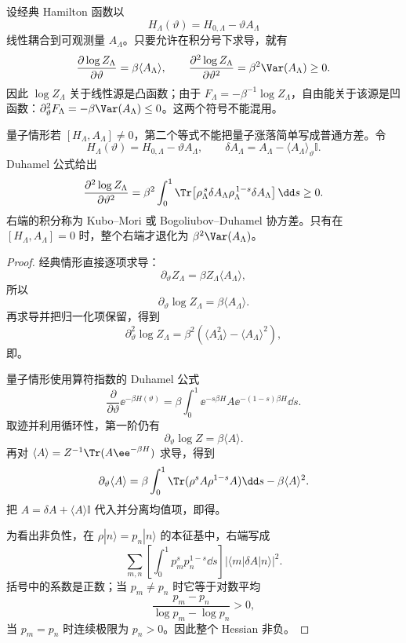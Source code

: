 \begin{proposition}[线性源的响应与凸性]
设经典 Hamilton 函数以
\[
 H_\Lambda(\vartheta)=H_{0,\Lambda}-\vartheta A_\Lambda
\]
线性耦合到可观测量 \(A_\Lambda\)。只要允许在积分号下求导，就有
\begin{equation}
 \frac{\partial\log Z_\Lambda}{\partial\vartheta}
 =\beta\langle A_\Lambda\rangle,
 \qquad
 \frac{\partial^2\log Z_\Lambda}{\partial\vartheta^2}
 =\beta^2\Var(A_\Lambda)\ge0.
 \label{eq:phys-sm-finite-response}
\end{equation}
因此 \(\log Z_\Lambda\) 关于线性源是凸函数；由于 \(F_\Lambda=-\beta^{-1}\log Z_\Lambda\)，自由能关于该源是凹函数：\(\partial_\vartheta^2F_\Lambda=-\beta\Var(A_\Lambda)\le0\)。这两个符号不能混用。

量子情形若 \([H_\Lambda,A_\Lambda]\neq0\)，第二个等式不能把量子涨落简单写成普通方差。令
\[
 H_\Lambda(\vartheta)=H_{0,\Lambda}-\vartheta A_\Lambda,
 \qquad
 \delta A_\Lambda=A_\Lambda-\langle A_\Lambda\rangle_\vartheta\mathbb I.
\]
Duhamel 公式给出
\begin{equation}
 \frac{\partial^2\log Z_\Lambda}{\partial\vartheta^2}
 =\beta^2
 \int_0^1
 \Tr\!\left[
 \rho_\Lambda^{\,s}\delta A_\Lambda
 \rho_\Lambda^{\,1-s}\delta A_\Lambda
 \right]\dd s
 \ge0.
 \label{eq:phys-sm-kubo-mori-response}
\end{equation}
右端的积分称为 Kubo--Mori 或 Bogoliubov--Duhamel 协方差。只有在 \([H_\Lambda,A_\Lambda]=0\) 时，整个右端才退化为 \(\beta^2\Var(A_\Lambda)\)。
\end{proposition}

\begin{proof}
经典情形直接逐项求导：
\[
 \partial_\vartheta Z_\Lambda
 =\beta Z_\Lambda\langle A_\Lambda\rangle,
\]
所以
\[
 \partial_\vartheta\log Z_\Lambda
 =\beta\langle A_\Lambda\rangle.
\]
再求导并把归一化项保留，得到
\[
 \partial_\vartheta^2\log Z_\Lambda
 =\beta^2
 \left(\langle A_\Lambda^2\rangle
 -\langle A_\Lambda\rangle^2\right),
\]
即。

量子情形使用算符指数的 Duhamel 公式
\[
 \frac{\partial}{\partial\vartheta}
 \ee^{-\beta H(\vartheta)}
 =\beta\int_0^1
 \ee^{-s\beta H}A
 \ee^{-(1-s)\beta H}\dd s.
\]
取迹并利用循环性，第一阶仍有
\[
 \partial_\vartheta\log Z=\beta\langle A\rangle.
\]
再对 \(\langle A\rangle=Z^{-1}\Tr(A\ee^{-\beta H})\) 求导，得到
\[
 \partial_\vartheta\langle A\rangle
 =\beta\int_0^1
 \Tr(\rho^sA\rho^{1-s}A)\dd s
 -\beta\langle A\rangle^2.
\]
把 \(A=\delta A+\langle A\rangle\mathbb I\) 代入并分离均值项，即得。

为看出非负性，在 \(\rho|n\rangle=p_n|n\rangle\) 的本征基中，右端写成
\[
 \sum_{m,n}
 \left[\int_0^1p_m^sp_n^{1-s}\dd s\right]
 |\langle m|\delta A|n\rangle|^2.
\]
括号中的系数是正数；当 \(p_m\neq p_n\) 时它等于对数平均
\[
 \frac{p_m-p_n}{\log p_m-\log p_n}>0,
\]
当 \(p_m=p_n\) 时连续极限为 \(p_n>0\)。因此整个 Hessian 非负。
\end{proof}



